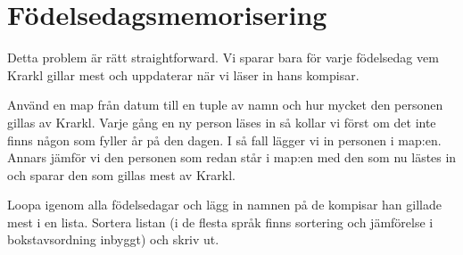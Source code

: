 \section{Födelsedagsmemorisering}
Detta problem är rätt straightforward. Vi sparar bara för varje födelsedag vem Krarkl gillar mest och uppdaterar när vi läser in hans kompisar.

Använd en map från datum till en tuple av namn och hur mycket den personen gillas av Krarkl.
Varje gång en ny person läses in så kollar vi först om det inte finns någon som fyller år på den dagen.
I så fall lägger vi in personen i map:en.
Annars jämför vi den personen som redan står i map:en med den som nu lästes in och sparar den som gillas mest av Krarkl.

Loopa igenom alla födelsedagar och lägg in namnen på de kompisar han gillade mest i en lista.
Sortera listan (i de flesta språk finns sortering och jämförelse i bokstavsordning inbyggt) och skriv ut.
